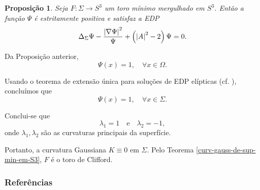 \documentclass[12pt,a4paper]{beamer}
\newtheorem{proposicao}{Proposição}
\theoremstyle{definition}
\begin{document}
\begin{frame}
	\begin{proposicao}
		Seja $F: \Sigma \rightarrow S^3$ um toro mínimo mergulhado em $S^3$. Então a função $\Psi$ é estritamente positiva e satisfaz a EDP
		\begin{equation*}
			\Delta_{\Sigma} \Psi - \frac{\left| \nabla \Psi \right|^2}{\Psi} + \left( \left| A \right|^2 - 2 \right) \Psi = 0.
		\end{equation*}
	\end{proposicao}
\end{frame}

\begin{frame}
	Da Proposição anterior,
	\[ \Psi(x) = 1, \quad \forall x \in \Omega. \]
	
	Usando o teorema de extensão única para soluções de EDP elípticas (cf. \cite{Aronszajn1957}), concluímos que
	\[ \Psi(x) = 1, \quad \forall x \in \Sigma. \]
	
	Conclui-se que
	\[ \lambda_1 = 1 \quad \text{e} \quad \lambda_2 = -1, \]
	onde $\lambda_1,\lambda_2$ são as curvaturas principais da superfície.
\end{frame}

\begin{frame}
	Portanto, a curvatura Gaussiana $K \equiv 0$ em $\Sigma$. Pelo Teorema \ref{curv-gauss-de-sup-min-em-S3}, $F$ é o toro de Clifford.
\end{frame}

\begin{frame}
	\frametitle{Referências}
	
\end{frame}
\end{document}

